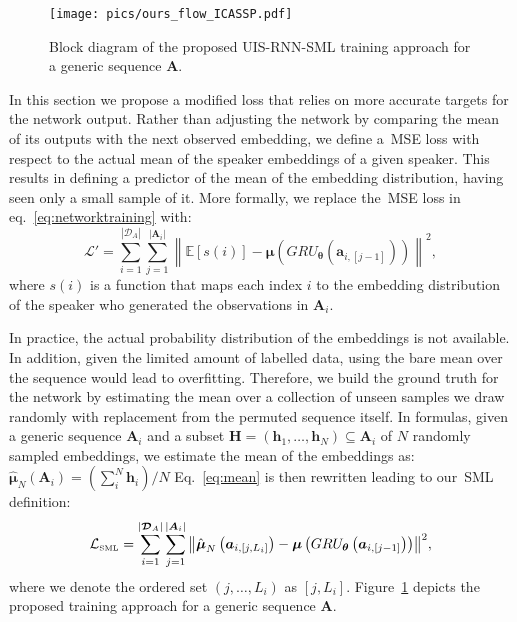 \documentclass{article}
\begin{document}
\begin{figure}[!ht]
\centering
  \texttt{[image: pics/ours\_flow\_ICASSP.pdf]}
  \caption{Block diagram of the proposed UIS-RNN-SML training approach for a generic sequence $\boldsymbol{A}$.}
  \label{fig:ours_flow}
\end{figure}

In this section we propose a modified loss that relies on more accurate targets for the network output. Rather than adjusting the network by comparing the mean of its outputs with the next observed embedding, we define a~\ac{MSE} loss with respect to the actual mean of the speaker embeddings of a given speaker. This results in defining a predictor of the mean of the embedding distribution, having seen only a small sample of it. 
More formally, we replace the~\ac{MSE} loss in eq.~\ref{eq:networktraining} with: 
\begin{equation}
\label{eq:mean}
\mathcal{L}' =  \sum_{i=1}^{|\boldsymbol{\mathcal{D}}_A|} \sum_{j=1}^{|\boldsymbol{A}_i|} {\left\| \mathbb{E}\left[s\left(i\right) \right]  -\boldsymbol{\mu}\left(GRU_{\boldsymbol{\theta}}\left(\boldsymbol{a}_{i,[j-1]}\right)\right) \right\|}^2,
\end{equation}
where $s\left(i\right)$ is a function that maps each index $i$ to the embedding distribution of the speaker who generated the observations in $\boldsymbol{A}_i$. 

In practice, the actual probability distribution of the embeddings is not available. In addition, given the limited amount of labelled data, using the bare mean over the sequence would lead to overfitting. Therefore, we build the ground truth for the network by estimating the mean over a collection of unseen samples we draw randomly with replacement from the permuted sequence itself. In formulas, given a generic sequence $\boldsymbol{A}_i$ and a subset $\boldsymbol{H} = \left(\boldsymbol{h}_1,\dots,\boldsymbol{h}_N \right) \subseteq\boldsymbol{A}_i$ of $N$ randomly sampled embeddings, we estimate the mean of the embeddings as:
$\hat{\boldsymbol{\mu}}_N\left(\boldsymbol{A}_i\right) = \left({\sum_{i}^N {\boldsymbol{h}_i}}\right)/{N}$
Eq.~\ref{eq:mean} is then rewritten leading to our~\ac{SML} definition:
\begin{equation}
\label{eq:sample-mean}
\mathcal{L}_{\mbox{\tiny{SML}}} = \sum_{i=1}^{|\boldsymbol{\mathcal{D}}_A|} \sum_{j=1}^{|\boldsymbol{A}_i|} {\left\| \hat{\boldsymbol{\mu}}_N\left(\boldsymbol{a}_{i,[j,L_i]}\right) -\boldsymbol{\mu}\left(GRU_{\boldsymbol{\theta}}\left(\boldsymbol{a}_{i,[j-1]}\right)\right) \right\|}^2,
\end{equation}
where we denote the ordered set $(j,\dots,L_i)$ as $[j,L_i]$. Figure~\ref{fig:ours_flow} depicts the proposed training approach for a generic sequence $\boldsymbol{A}$.
\end{document}
